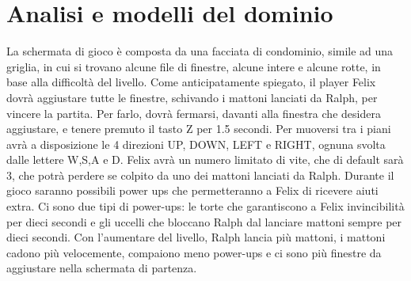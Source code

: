 \documentclass[a4paper,12pt]{report}
\begin{document}
\section{Analisi e modelli del dominio}
La schermata di gioco è composta da una facciata di condominio, simile ad una griglia, in cui si trovano alcune file di finestre, alcune intere e alcune rotte, in base alla difficoltà del livello.
Come anticipatamente spiegato, il player Felix dovrà aggiustare tutte le finestre, schivando i mattoni lanciati da Ralph, per vincere la partita.
Per farlo, dovrà fermarsi, davanti alla finestra che desidera aggiustare, e tenere premuto il tasto Z per 1.5 secondi. 
Per muoversi tra i piani avrà a disposizione le 4 direzioni UP, DOWN, LEFT e RIGHT, ognuna svolta dalle lettere W,S,A e D.
Felix avrà un numero limitato di vite, che di default sarà 3, che potrà perdere se colpito da uno dei mattoni lanciati da Ralph.
Durante il gioco saranno possibili power ups che permetteranno a Felix di ricevere aiuti extra.
Ci sono due tipi di power-ups: le torte che garantiscono a Felix invincibilità per dieci secondi e gli uccelli che bloccano Ralph dal lanciare mattoni sempre per dieci secondi.
Con l'aumentare del livello, Ralph lancia più mattoni, i mattoni cadono più velocemente, compaiono meno power-ups e ci sono più finestre da aggiustare nella schermata di partenza. 
\end{document}
